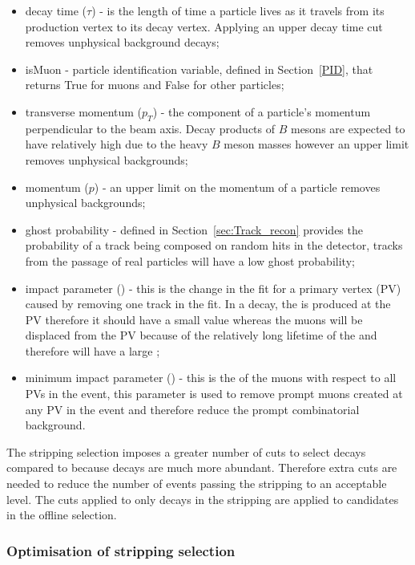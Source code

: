 \begin{itemize}
\item decay time ($\tau$) - is the length of time a particle lives as it travels from its production vertex to its decay vertex. Applying an upper decay time cut removes unphysical background decays;
\item isMuon - particle identification variable, defined in Section~\ref{PID}, that returns True for muons and False for other particles;
\item transverse momentum ($p_{T}$) - the component of a particle's momentum perpendicular to the beam axis. Decay products of $B$ mesons are expected to have relatively high \pt due to the heavy $B$ meson masses however an upper limit removes unphysical backgrounds;
\item momentum ($p$) - an upper limit on the momentum of a particle  removes unphysical backgrounds;
\item ghost probability - defined in Section~\ref{sec:Track_recon} provides the probability of a track being composed on random hits in the detector, tracks from the passage of real particles will have a low ghost probability; 
\item impact parameter \chisqd (\chiIP) - this is the change in the fit \chisqd for a primary vertex (PV) caused by removing one track in the fit. In a \bsmumu decay, the \bsd is produced at the PV therefore it should have a small \chiIP value whereas the muons will be displaced from the PV because of the relatively long lifetime of the \bsd and therefore will have a large \chiIP;
\item minimum impact parameter (\chiIP) - this is the \chiIP  of the muons with respect to all PVs in the event, this parameter is used to remove prompt muons created at any PV in the event and therefore reduce the prompt combinatorial background. 
\end{itemize}

The stripping selection imposes a greater number of cuts to select \bhh decays compared to \bsmumu because \bhh decays are much more abundant. Therefore extra cuts are needed to reduce the number of events passing the stripping to an acceptable level. The cuts applied to only \bhh decays in the stripping are applied to \bsmumu candidates in the offline selection. %


\subsubsection{Optimisation of \bsmumu stripping selection}
\label{strippingstudies}

